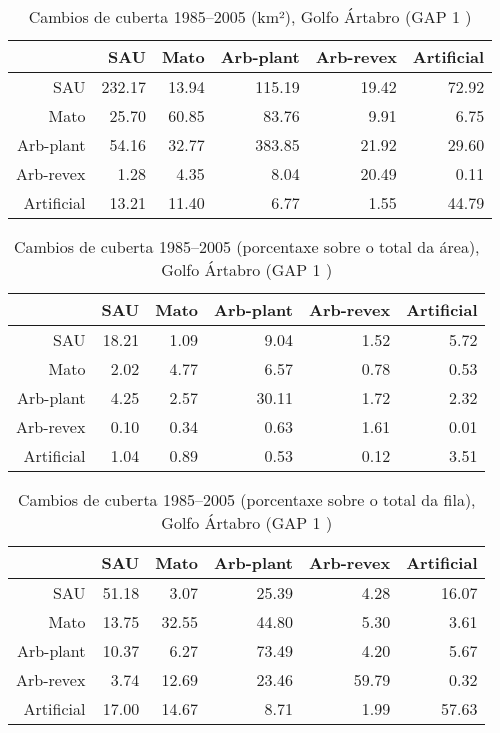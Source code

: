 \begin{table}[p]
\centering
\caption{Cambios de cuberta 1985--2005 (km²), Golfo Ártabro (GAP 1 )} 
\label{TaboaContinxGAP1}
\begin{tabular}{rrrrrr}
  \hline
 & SAU & Mato & Arb-plant & Arb-revex & Artificial \\ 
  \hline
SAU & 232.17 & 13.94 & 115.19 & 19.42 & 72.92 \\ 
  Mato & 25.70 & 60.85 & 83.76 & 9.91 & 6.75 \\ 
  Arb-plant & 54.16 & 32.77 & 383.85 & 21.92 & 29.60 \\ 
  Arb-revex & 1.28 & 4.35 & 8.04 & 20.49 & 0.11 \\ 
  Artificial & 13.21 & 11.40 & 6.77 & 1.55 & 44.79 \\ 
   \hline
\end{tabular}
\end{table}
\begin{table}[p]
\centering
\caption{Cambios de cuberta 1985--2005 (porcentaxe sobre o total da área), Golfo Ártabro (GAP 1 )} 
\label{TaboaContinxPTGAP1}
\begin{tabular}{rrrrrr}
  \hline
 & SAU & Mato & Arb-plant & Arb-revex & Artificial \\ 
  \hline
SAU & 18.21 & 1.09 & 9.04 & 1.52 & 5.72 \\ 
  Mato & 2.02 & 4.77 & 6.57 & 0.78 & 0.53 \\ 
  Arb-plant & 4.25 & 2.57 & 30.11 & 1.72 & 2.32 \\ 
  Arb-revex & 0.10 & 0.34 & 0.63 & 1.61 & 0.01 \\ 
  Artificial & 1.04 & 0.89 & 0.53 & 0.12 & 3.51 \\ 
   \hline
\end{tabular}
\end{table}
\begin{table}[p]
\centering
\caption{Cambios de cuberta 1985--2005 (porcentaxe sobre o total da fila), Golfo Ártabro (GAP 1 )} 
\label{TaboaContinxPFGAP1}
\begin{tabular}{rrrrrr}
  \hline
 & SAU & Mato & Arb-plant & Arb-revex & Artificial \\ 
  \hline
SAU & 51.18 & 3.07 & 25.39 & 4.28 & 16.07 \\ 
  Mato & 13.75 & 32.55 & 44.80 & 5.30 & 3.61 \\ 
  Arb-plant & 10.37 & 6.27 & 73.49 & 4.20 & 5.67 \\ 
  Arb-revex & 3.74 & 12.69 & 23.46 & 59.79 & 0.32 \\ 
  Artificial & 17.00 & 14.67 & 8.71 & 1.99 & 57.63 \\ 
   \hline
\end{tabular}
\end{table}
